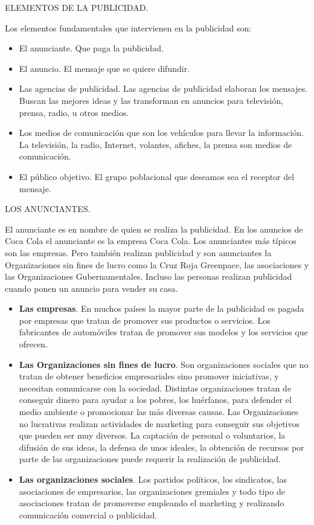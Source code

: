 ELEMENTOS DE LA PUBLICIDAD.

Los elementos fundamentales que intervienen en la publicidad son:

\begin{itemize}
  \item El anunciante. Que paga la publicidad.
  \item El anuncio. El mensaje que se quiere difundir.
  \item Las agencias de publicidad. Las agencias de publicidad elaboran los mensajes. Buscan las mejores ideas y las transforman en anuncios para televisión, prensa, radio, u otros medios.
  \item Los medios de comunicación que son los vehículos para llevar la información. La televisión, la radio, Internet, volantes, afiches, la prensa son medios de comunicación.
  \item El público objetivo. El grupo poblacional que deseamos sea el receptor del mensaje.
\end{itemize}
LOS ANUNCIANTES.

El anunciante es en nombre de quien se realiza la publicidad. En los anuncios de Coca Cola el anunciante es la empresa Coca Cola. Los anunciantes más típicos son las empresas. Pero también realizan publicidad y son anunciantes la Organizaciones sin fines de lucro como la Cruz Roja Greenpace, las asociaciones y las Organizaciones Gubernamentales. Incluso las personas realizan publicidad cuando ponen un anuncio para vender su casa.

\begin{itemize}
  \item \textbf{Las empresas}. En muchos países la mayor parte de la publicidad es pagada por empresas que tratan de promover sus productos o servicios. Los fabricantes de automóviles tratan de promover sus modelos y los servicios que ofrecen.
  \item \textbf{Las Organizaciones sin fines de lucro}. Son organizaciones sociales que no tratan de obtener beneficios empresariales sino promover iniciativas, y necesitan comunicarse con la sociedad. Distintas organizaciones tratan de conseguir dinero para ayudar a los pobres, los huérfanos, para defender el medio ambiente o promocionar las más diversas causas. Las Organizaciones no lucrativas realizan actividades de marketing para conseguir sus objetivos que pueden ser muy diversos. La captación de personal o voluntarios, la difusión de sus ideas, la defensa de unos ideales, la obtención de recursos por parte de las organizaciones puede requerir la realización de publicidad.
  \item \textbf{Las organizaciones sociales}. Los partidos políticos, los sindicatos, las asociaciones de empresarios, las organizaciones gremiales y todo tipo de asociaciones tratan de promoverse empleando el marketing y realizando comunicación comercial o publicidad.
\end{itemize}

